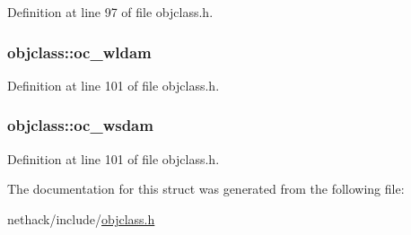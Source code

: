 Definition at line 97 of file objclass.\+h.

\hypertarget{structobjclass_a5b1b27312dd044cae590ed1cabc33c7b}{
\subsubsection[{oc\+\_\+wldam}]{ objclass\+::oc\+\_\+wldam}}\label{structobjclass_a5b1b27312dd044cae590ed1cabc33c7b}


Definition at line 101 of file objclass.\+h.

\hypertarget{structobjclass_aafe7abae4189e2b8a8b5c697ae679415}{
\subsubsection[{oc\+\_\+wsdam}]{ objclass\+::oc\+\_\+wsdam}}\label{structobjclass_aafe7abae4189e2b8a8b5c697ae679415}


Definition at line 101 of file objclass.\+h.



The documentation for this struct was generated from the following file\+:\begin{DoxyCompactItemize}
\item 
nethack/include/\hyperlink{objclass_8h}{objclass.\+h}\end{DoxyCompactItemize}
